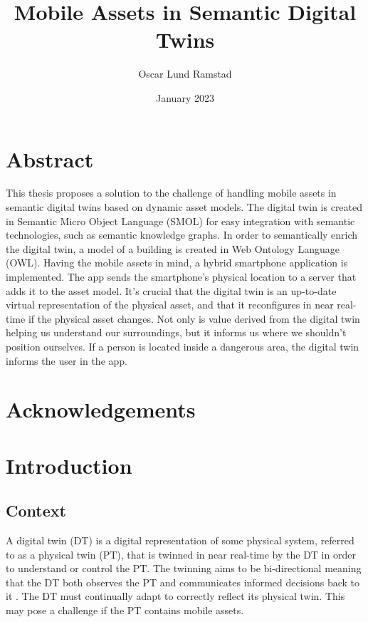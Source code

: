 \documentclass{article}
\begin{document}
\title{Mobile Assets in Semantic Digital Twins}
\author{Oscar Lund Ramstad}
\date{January 2023}

\duoforside[dept={Institute for Informatics}, program={Informatics: Programming and System Architecture}, short]

\section*{Abstract}
This thesis proposes a solution to the challenge of handling mobile assets in semantic digital twins based on dynamic asset models. The digital twin is created in Semantic Micro Object Language (SMOL) for easy integration with semantic technologies, such as semantic knowledge graphs. In order to semantically enrich the digital twin, a model of a building is created in Web Ontology Language (OWL).  Having the mobile assets in mind, a hybrid smartphone application is implemented. The app sends the smartphone's physical location to a server that adds it to the asset model. It's crucial that the digital twin is an up-to-date virtual representation of the physical asset, and that it reconfigures in near real-time if the physical asset changes. Not only is value derived from the digital twin helping us understand our surroundings, but it informs us where we shouldn't position ourselves. If a person is located inside a dangerous area, the digital twin informs the user in the app.

\newpage

\section*{Acknowledgements}
\newpage

\tableofcontents
\newpage

\listoftables
\newpage

\listoffigures
\newpage

\setcounter{page}{1}

\section{Introduction}
\subsection{Context}
A digital twin (DT) is a digital representation of some physical system, referred to as a physical twin (PT), that is twinned in near real-time by the DT in order to understand or control the PT. The twinning aims to be bi-directional meaning that the DT both observes the PT and communicates informed decisions back to it \cite{kamburjan_digital_2022}. The DT must continually adapt to correctly reflect its physical twin. This may pose a challenge if the PT contains mobile assets.
\end{document}

